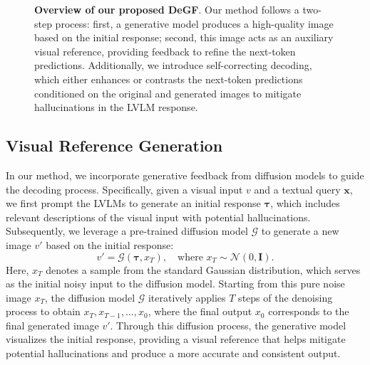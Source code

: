 \begin{figure}[t]
  \begin{center}
  \end{center}
  \vspace{-10pt}
  \caption{\textbf{Overview of our proposed DeGF}. Our method follows a two-step process: first, a generative model produces a high-quality image based on the initial response; second, this image acts as an auxiliary visual reference, providing feedback to refine the next-token predictions. Additionally, we introduce self-correcting decoding, which either enhances or contrasts the next-token predictions conditioned on the original and generated images to mitigate hallucinations in the LVLM response.} %
  \label{fig:overview}
\end{figure}

\subsection{Visual Reference Generation}
\label{sec:diffusion}
In our method, we incorporate generative feedback from diffusion models to guide the decoding process. Specifically, given a visual input $v$ and a textual query $\mathbf{x}$, we first prompt the LVLMs to generate an initial response $\boldsymbol{\tau}$, which includes relevant descriptions of the visual input with potential hallucinations. Subsequently, we leverage a pre-trained diffusion model $\mathcal{G}$ to generate a new image $v'$ based on the initial response:
\begin{equation}
v' = \mathcal{G}(\boldsymbol{\tau}, x_T), \quad\text{where} \,\,x_T \sim \mathcal{N}(0, \mathbf{I}).
\end{equation}
Here, $x_T$ denotes a sample from the standard Gaussian distribution, which serves as the initial noisy input to the diffusion model. Starting from this pure noise image $x_T$, the diffusion model $\mathcal{G}$ iteratively applies $T$ steps of the denoising process to obtain $x_T, x_{T-1}, \dots, x_0$, where the final output $x_0$ corresponds to the final generated image $v'$. Through this diffusion process, the generative model visualizes the initial response, providing a visual reference that helps mitigate potential hallucinations and produce a more accurate and consistent output.



